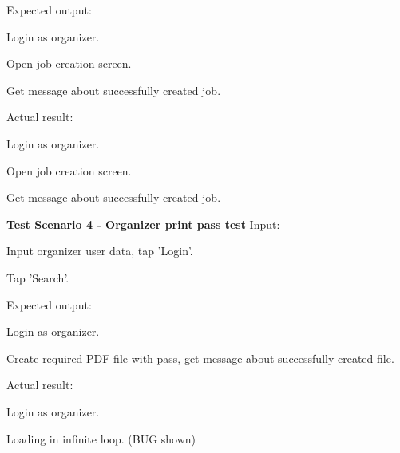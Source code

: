  			Expected output:
 			\begin{packed_enum}
 				\item Login as organizer.
 				\item Open job creation screen.
 				\item Get message about successfully created job.
 			\end{packed_enum}
	 		
	 		Actual result:
	 		\begin{packed_enum}
	 			\item Login as organizer.
	 			\item Open job creation screen.
	 			\item Get message about successfully created job.
	 		\end{packed_enum}
			\eject 
			
			\textbf{Test Scenario 4 - Organizer print pass test}
			Input:
			\begin{packed_enum}
				\item Input organizer user data, tap 'Login'.
				\item Tap 'Search'.
			\end{packed_enum}
			
			Expected output:
			\begin{packed_enum}
				\item Login as organizer.
				\item Create required PDF file with pass, get message about successfully created file.
			\end{packed_enum}
			
			Actual result:
			\begin{packed_enum}
				\item Login as organizer.
				\item Loading in infinite loop. (BUG shown)
			\end{packed_enum}
		
